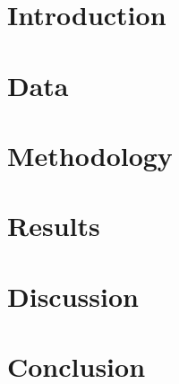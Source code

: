\documentclass[11pt]{article}
\begin{document}

\tableofcontents
\newpage

\section{Introduction}


\section{Data}


\section{Methodology}


\section{Results}


\section{Discussion}
\label{sec:discussion}


\section{Conclusion}






\clearpage

\end{document}
